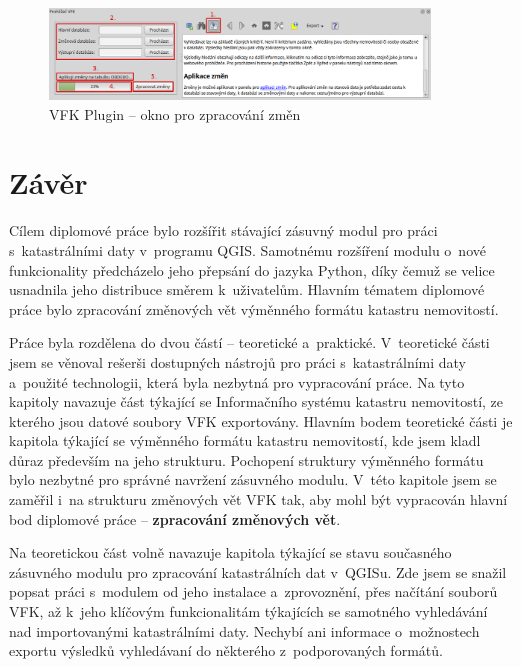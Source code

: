 \documentclass[a4paper,12pt,oneside]{book}
\begin{document}
\begin{figure}[htb]
\centering
\includegraphics[width=0.9\textwidth]{images/vfkPlugin-zmeny.png}
\caption[VFK Plugin -- okno pro zpracování změn]{VFK Plugin -- okno pro zpracování změn}
\label{l_plugin_zmeny}
\end{figure}


\clearpage
{}       %
\chapter*{Závěr}


Cílem diplomové práce bylo rozšířit stávající zásuvný modul pro práci
s~katastrálními daty v~programu QGIS. Samotnému rozšíření modulu
o~nové funkcionality předcházelo jeho přepsání do jazyka Python, díky
čemuž se velice usnadnila jeho distribuce směrem k~uživatelům. Hlavním
tématem diplomové práce bylo zpracování změnových vět výměnného
formátu katastru nemovitostí.

Práce byla rozdělena do dvou částí -- teoretické
a~praktické. V~teoretické části jsem se věnoval rešerši dostupných
nástrojů pro práci s~katastrálními daty a~použité
technologii, která byla nezbytná pro vypracování práce. Na tyto
kapitoly navazuje část týkající se Informačního systému katastru
nemovitostí, ze kterého jsou datové soubory VFK exportovány. 
Hlavním bodem teoretické části je kapitola týkající se výměnného formátu
katastru nemovitostí, kde jsem kladl důraz především na jeho strukturu.
Pochopení struktury výměnného formátu bylo nezbytné pro správné navržení
zásuvného modulu. V~této kapitole jsem se zaměřil i~na strukturu změnových vět 
VFK tak, aby mohl být vypracován hlavní 
bod diplomové práce -- \textbf{zpracování změnových vět}.

Na teoretickou část volně navazuje kapitola týkající se stavu
současného zásuvného modulu pro zpracování katastrálních dat
v~QGISu. Zde jsem se snažil popsat práci s~modulem od jeho instalace
a~zprovoznění, přes načítání souborů VFK, až k~jeho klíčovým
funkcionalitám týkajících se samotného vyhledávání nad importovanými
katastrálními daty. Nechybí ani informace o~možnostech exportu
výsledků vyhledávaní do některého z~podporovaných formátů.
\end{document}

